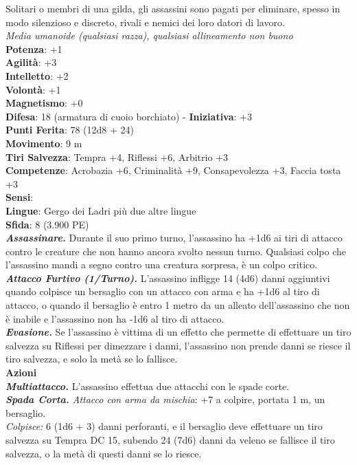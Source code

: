 \begin{multicols}{2}
Solitari o membri di una gilda, gli assassini sono pagati per eliminare, spesso in modo silenzioso e discreto, rivali e nemici dei loro datori di lavoro.\\
\emph{Media umanoide (qualsiasi razza), qualsiasi allineamento non buono}\\
\textbf{Potenza}: +1\\
\textbf{Agilità}: +3\\
\textbf{Intelletto}: +2\\
\textbf{Volontà}: +1\\
\textbf{Magnetismo}: +0\\
\textbf{Difesa}: 18 (armatura di cuoio borchiato) - \textbf{Iniziativa}: +3\\
\textbf{Punti Ferita}: 78 (12d8 + 24)\\
\textbf{Movimento}: 9 m\\
\textbf{Tiri Salvezza}: Tempra +4, Riflessi +6, Arbitrio +3 \\
\textbf{Competenze}: Acrobazia +6, Criminalità +9, Consapevolezza +3, Faccia tosta +3\\
\textbf{Sensi}: \\
\textbf{Lingue}: Gergo dei Ladri più due altre lingue\\
\textbf{Sfida}: 8 (3.900 PE)\smallskip\\

\emph{\textbf{Assassinare.}} Durante il suo primo turno, l'assassino ha +1d6 ai tiri di attacco contro le creature che non hanno ancora svolto nessun turno. Qualsiasi colpo che l'assassino mandi a segno contro una creatura sorpresa, è un colpo critico.\\

\emph{\textbf{Attacco Furtivo (1/Turno).}} L'assassino infligge 14 (4d6) danni aggiuntivi quando colpisce un bersaglio con un attacco con arma e ha +1d6 al tiro di attacco, o quando il bersaglio è entro 1 metro da un alleato dell'assassino che non è inabile e l'assassino non ha -1d6 al tiro di attacco.\\

\emph{\textbf{Evasione.}} Se l'assassino è vittima di un effetto che permette di effettuare un tiro salvezza su Riflessi per dimezzare i danni, l'assassino non prende danni se riesce il tiro salvezza, e solo la metà se lo fallisce.\\

\smallskip\textbf{Azioni}\\

\emph{\textbf{Multiattacco.}} L'assassino effettua due attacchi con le spade corte.\\
\emph{\textbf{Spada Corta.} Attacco con arma da mischia}: +7 a colpire, portata 1 m, un bersaglio.\\
\emph{Colpisce:} 6 (1d6 + 3) danni perforanti, e il bersaglio deve effettuare un tiro salvezza su Tempra DC 15, subendo 24 (7d6) danni da veleno se fallisce il tiro salvezza, o la metà di questi danni se lo riesce.\\


\end{multicols}

